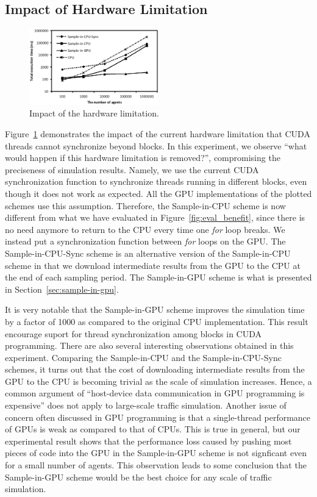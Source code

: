 \documentclass[times, 10pt, twocolumn]{article}
\begin{document}
\subsection{Impact of Hardware Limitation}

\begin{figure}[t]
\centering
\includegraphics[width=0.5\textwidth]{eps/eval_nosync.eps}
\caption{Impact of the hardware limitation.}
\label{fig:eval_nosync}
\end{figure}

Figure~\ref{fig:eval_nosync} demonstrates the impact of the current
hardware limitation that CUDA threads cannot synchronize beyond blocks.
In this experiment, we observe ``what would happen if this hardware
limitation is removed?'', compromising the preciseness of simulation
results.
Namely, we use the current CUDA synchronization function to synchronize
threads running in different blocks, even though it does not work as
expected.
All the GPU implementations of the plotted schemes use this assumption.
Therefore, the Sample-in-CPU scheme is now different from what we have
evaluated in Figure~\ref{fig:eval_benefit}, since there is no need
anymore to return to the CPU every time one \textit{for} loop breaks.
We instead put a synchronization function between \textit{for} loops on
the GPU.
The Sample-in-CPU-Sync scheme is an alternative version of the
Sample-in-CPU scheme in that we download intermediate results from the
GPU to the CPU at the end of each sampling period.
The Sample-in-GPU scheme is what is presented in
Section~\ref{sec:sample-in-gpu}.

It is very notable that the Sample-in-GPU scheme improves the simulation
time by a factor of 1000 as compared to the original CPU implementation.
This result encourage suport for thread synchronization among blocks in
CUDA programming.
There are also several interesting observations obtained in this
experiment.
Comparing the Sample-in-CPU and the Sample-in-CPU-Sync schemes, it turns
out that the cost of downloading intermediate results from the GPU to
the CPU is becoming trivial as the scale of simulation increases.
Hence, a common argument of ``host-device data communication in GPU
programming is expensive'' does not apply to large-scale traffic
simulation.
Another issue of concern often discussed in GPU programming is that
a single-thread performance of GPUs is weak as compared to that of CPUs.
This is true in general, but our experimental result shows that the
performance loss caused by pushing most pieces of code into the GPU in
the Sample-in-GPU scheme is not signficant even for a small number of
agents.
This observation leads to some conclusion that the Sample-in-GPU scheme
would be the best choice for any scale of traffic simulation.
\end{document}
